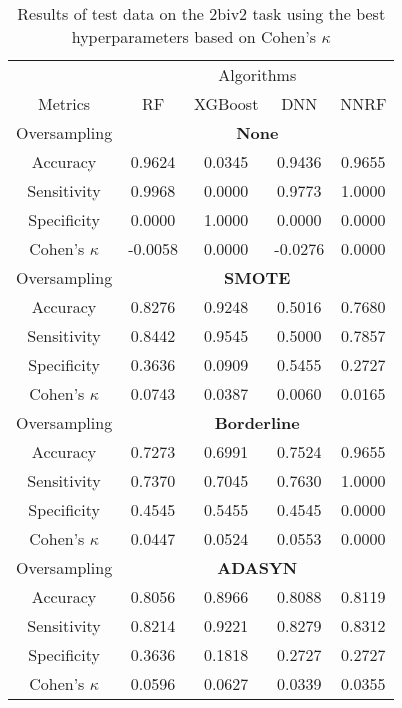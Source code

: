 \begin{table}[!htb]
\centering
\caption{Results of test data on the 2biv2 task using the best hyperparameters based on Cohen's $\kappa$}
\label{tab:2biv2_test_results}
\begin{tabular}{c | c c c c}
\hline
 & \multicolumn{4}{c}{Algorithms}\\ 
Metrics &RF & XGBoost & DNN & NNRF\\ 
\hline
Oversampling &\multicolumn{4}{|c}{\textbf{None}}\\ 
\hline
Accuracy & 0.9624 & 0.0345 & 0.9436 & 0.9655\\ 
Sensitivity & 0.9968 & 0.0000 & 0.9773 & 1.0000\\ 
Specificity & 0.0000 & 1.0000 & 0.0000 & 0.0000\\ 
Cohen's $\kappa$ & -0.0058 & 0.0000 & -0.0276 & 0.0000\\ 
\hline
Oversampling &\multicolumn{4}{|c}{\textbf{SMOTE}}\\ 
\hline
Accuracy & 0.8276 & 0.9248 & 0.5016 & 0.7680\\ 
Sensitivity & 0.8442 & 0.9545 & 0.5000 & 0.7857\\ 
Specificity & 0.3636 & 0.0909 & 0.5455 & 0.2727\\ 
Cohen's $\kappa$ & 0.0743 & 0.0387 & 0.0060 & 0.0165\\ 
\hline
Oversampling &\multicolumn{4}{|c}{\textbf{Borderline}}\\ 
\hline
Accuracy & 0.7273 & 0.6991 & 0.7524 & 0.9655\\ 
Sensitivity & 0.7370 & 0.7045 & 0.7630 & 1.0000\\ 
Specificity & 0.4545 & 0.5455 & 0.4545 & 0.0000\\ 
Cohen's $\kappa$ & 0.0447 & 0.0524 & 0.0553 & 0.0000\\ 
\hline
Oversampling &\multicolumn{4}{|c}{\textbf{ADASYN}}\\ 
\hline
Accuracy & 0.8056 & 0.8966 & 0.8088 & 0.8119\\ 
Sensitivity & 0.8214 & 0.9221 & 0.8279 & 0.8312\\ 
Specificity & 0.3636 & 0.1818 & 0.2727 & 0.2727\\ 
Cohen's $\kappa$ & 0.0596 & 0.0627 & 0.0339 & 0.0355\\ 
\hline
\end{tabular}
\end{table}


